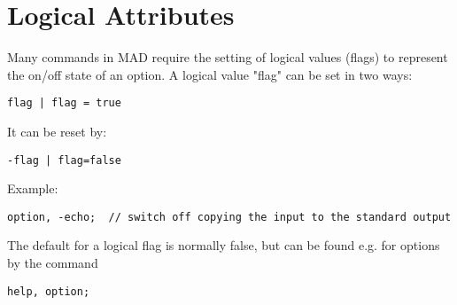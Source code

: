 
\section{Logical Attributes}

Many commands in MAD require the setting of logical values (flags) to
represent the on/off state of an option. A logical value "flag" can be
set in two ways:  
\begin{verbatim}
flag | flag = true
\end{verbatim} 

It can be reset by: 
\begin{verbatim}
-flag | flag=false
\end{verbatim} 

Example: 
\begin{verbatim}
option, -echo;  // switch off copying the input to the standard output
\end{verbatim} 

The default for a logical flag is normally false, but can be found e.g. for options by the command  
\begin{verbatim}
help, option;
\end{verbatim}


